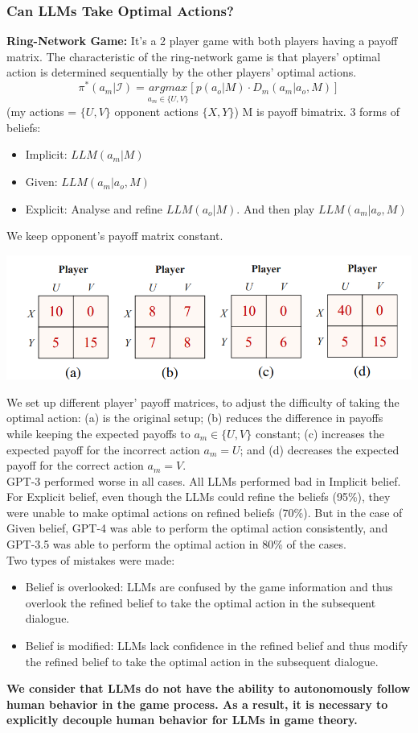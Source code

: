 \documentclass[12pt]{article}
\begin{document}
\subsubsection*{Can LLMs Take Optimal Actions?}
\textbf{Ring-Network Game:} It's a 2 player game with both players having a payoff matrix. The characteristic of the ring-network game is that players' optimal action is determined sequentially by the other players' optimal actions.
\[\pi^*(a_m|\mathcal{I})=\underset{a_m\in\{U,V\}}{argmax}\left[p(a_o|M)\cdot D_m(a_m|a_o,M)\right]\] 
(my actions = $\{U,V\}$ opponent actions $\{X,Y\}$) M is payoff bimatrix. 3 forms of beliefs:
\begin{itemize}
  \item Implicit: $LLM(a_m|M)$
  \item Given: $LLM(a_m|a_o,M)$
  \item Explicit: Analyse and refine $LLM(a_o|M)$. And then play $LLM(a_m|a_o,M)$
\end{itemize}
We keep opponent's payoff matrix constant. 
\begin{center}
  \includegraphics*{table3.png}
\end{center}
We set up different player' payoff matrices, to adjust the difficulty of taking the optimal action: (a) is the original setup; (b) reduces the difference in
payoffs while keeping the expected payoffs to $a_m \in \{U, V \}$
constant; (c) increases the expected payoff for the incorrect action $a_m = U$; and (d) decreases the expected payoff for
the correct action $a_m = V$.\\
GPT-3 performed worse in all cases. All LLMs performed bad in Implicit belief. For Explicit belief, even though the LLMs could refine the beliefs (95\%), they were unable to make optimal actions on refined beliefs (70\%). But in the case of Given belief, GPT-4 was able to perform the optimal action consistently, and GPT-3.5 was able to perform the optimal action in 80\% of the cases.\\
Two types of mistakes were made:
\begin{itemize}
  \item Belief is overlooked: LLMs are confused by the game information and thus overlook the refined belief to take the
  optimal action in the subsequent dialogue.
  \item Belief is modified: LLMs lack confidence in the refined
  belief and thus modify the refined belief to take the optimal action in the subsequent dialogue.
\end{itemize}
\textbf{We consider that LLMs do not have the ability to
autonomously follow human behavior in the game process. As a result, it is necessary to explicitly decouple human behavior for LLMs in game theory.}
\end{document}
